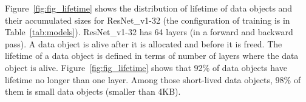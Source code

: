Figure~\ref{fig:fig_lifetime} shows the distribution of lifetime of data objects and their accumulated sizes for ResNet\_v1-32 (the configuration of training is in Table~\ref{tab:models}). ResNet\_v1-32 has 64 layers (in a forward and backward pass).  %
A data object is alive after it is allocated and before it is freed. The lifetime of a data object is defined in terms of number of layers where the data object is alive.
Figure~\ref{fig:fig_lifetime} shows that 92\% of data objects have lifetime no longer than one layer. Among those short-lived data objects, 98\% of them is small data objects (smaller than 4KB). 

